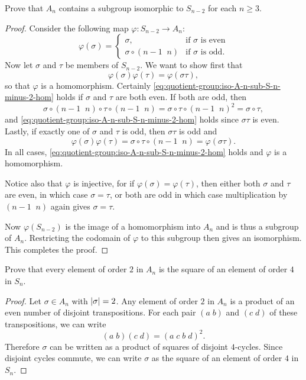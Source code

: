  Prove that $A_n$ contains a subgroup isomorphic to
$S_{n-2}$ for each $n\geq3$.
\begin{proof}
  Consider the following map $\varphi\colon S_{n-2}\to A_n$:
  \begin{equation*}
    \varphi(\sigma) =
    \begin{cases}
      \sigma, & \text{if $\sigma$ is even} \\
      \sigma\circ(n-1\;\;n) & \text{if $\sigma$ is odd.}
    \end{cases}
  \end{equation*}
  Now let $\sigma$ and $\tau$ be members of $S_{n-2}$. We want to show
  first that
  \begin{equation}
    \label{eq:quotient-group:iso-A-n-sub-S-n-minus-2-hom}
    \varphi(\sigma)\varphi(\tau) = \varphi(\sigma\tau),
  \end{equation}
  so that $\varphi$ is a homomorphism. Certainly
  \eqref{eq:quotient-group:iso-A-n-sub-S-n-minus-2-hom} holds if
  $\sigma$ and $\tau$ are both even. If both are odd, then
  \begin{equation*}
    \sigma\circ(n-1\;\;n)\circ\tau\circ(n-1\;\;n)
    = \sigma\circ\tau\circ(n-1\;\;n)^2
    = \sigma\circ\tau,
  \end{equation*}
  and \eqref{eq:quotient-group:iso-A-n-sub-S-n-minus-2-hom} holds
  since $\sigma\tau$ is even. Lastly, if exactly one of $\sigma$ and
  $\tau$ is odd, then $\sigma\tau$ is odd and
  \begin{equation*}
    \varphi(\sigma)\varphi(\tau) = \sigma\circ\tau\circ(n-1\;\;n)
    = \varphi(\sigma\tau).
  \end{equation*}
  In all cases, \eqref{eq:quotient-group:iso-A-n-sub-S-n-minus-2-hom}
  holds and $\varphi$ is a homomorphism.

  Notice also that $\varphi$ is injective, for if
  $\varphi(\sigma) = \varphi(\tau)$, then either both $\sigma$ and
  $\tau$ are even, in which case $\sigma = \tau$, or both are odd in
  which case multiplication by $(n-1\;\;n)$ again gives
  $\sigma = \tau$.

  Now $\varphi(S_{n-2})$ is the image of a homomorphism into $A_n$ and
  is thus a subgroup of $A_n$. Restricting the codomain of $\varphi$
  to this subgroup then gives an isomorphism. This completes the
  proof.
\end{proof}

 Prove that every element of order $2$ in $A_n$ is the
square of an element of order $4$ in $S_n$.
\begin{proof}
  Let $\sigma\in A_n$ with $\lvert{\sigma}\rvert = 2$. Any element of order
  $2$ in $A_n$ is a product of an even number of disjoint
  transpositions. For each pair $(a\;b)$ and $(c\;d)$ of these
  transpositions, we can write
  \begin{equation*}
    (a\;b)(c\;d) = (a\;c\;b\;d)^2.
  \end{equation*}
  Therefore $\sigma$ can be written as a product of squares of
  disjoint $4$-cycles. Since disjoint cycles commute, we can write
  $\sigma$ as the square of an element of order $4$ in $S_n$.
\end{proof}

